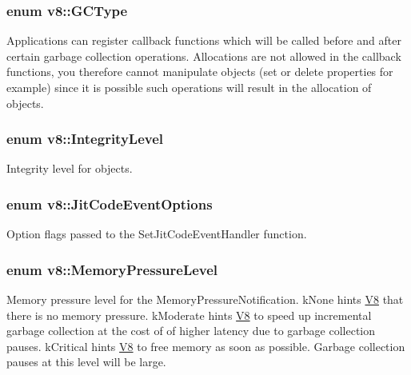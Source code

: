 \subsubsection[{\texorpdfstring{G\+C\+Type}{GCType}}]{\setlength{\rightskip}{0pt plus 5cm}enum {\bf v8\+::\+G\+C\+Type}}\hypertarget{namespacev8_ac109d6f27e0c0f9ef4e98bcf7a806cf2}{}\label{namespacev8_ac109d6f27e0c0f9ef4e98bcf7a806cf2}
Applications can register callback functions which will be called before and after certain garbage collection operations. Allocations are not allowed in the callback functions, you therefore cannot manipulate objects (set or delete properties for example) since it is possible such operations will result in the allocation of objects. 
\subsubsection[{\texorpdfstring{Integrity\+Level}{IntegrityLevel}}]{\setlength{\rightskip}{0pt plus 5cm}enum {\bf v8\+::\+Integrity\+Level}\hspace{0.3cm}{\ttfamily [strong]}}\hypertarget{namespacev8_a02642d03ff1eecc2fd358626499c2e30}{}\label{namespacev8_a02642d03ff1eecc2fd358626499c2e30}
Integrity level for objects. 
\subsubsection[{\texorpdfstring{Jit\+Code\+Event\+Options}{JitCodeEventOptions}}]{\setlength{\rightskip}{0pt plus 5cm}enum {\bf v8\+::\+Jit\+Code\+Event\+Options}}\hypertarget{namespacev8_a06f34fa4fa4cfc8518366808d1d461c1}{}\label{namespacev8_a06f34fa4fa4cfc8518366808d1d461c1}
Option flags passed to the Set\+Jit\+Code\+Event\+Handler function. 
\subsubsection[{\texorpdfstring{Memory\+Pressure\+Level}{MemoryPressureLevel}}]{\setlength{\rightskip}{0pt plus 5cm}enum {\bf v8\+::\+Memory\+Pressure\+Level}\hspace{0.3cm}{\ttfamily [strong]}}\hypertarget{namespacev8_ae0e9a25bf51e518585f555806e7dc7b9}{}\label{namespacev8_ae0e9a25bf51e518585f555806e7dc7b9}
Memory pressure level for the Memory\+Pressure\+Notification. k\+None hints \hyperlink{classv8_1_1_v8}{V8} that there is no memory pressure. k\+Moderate hints \hyperlink{classv8_1_1_v8}{V8} to speed up incremental garbage collection at the cost of of higher latency due to garbage collection pauses. k\+Critical hints \hyperlink{classv8_1_1_v8}{V8} to free memory as soon as possible. Garbage collection pauses at this level will be large. 
